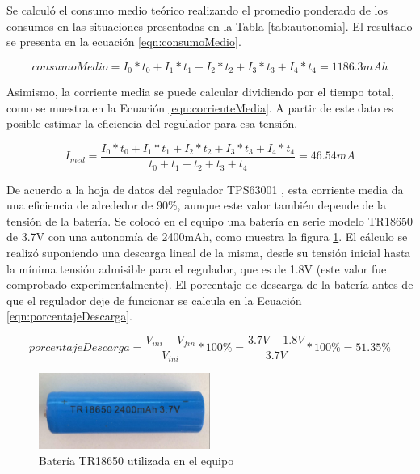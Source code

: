 Se calculó el consumo medio teórico realizando el promedio ponderado de los consumos en las situaciones presentadas en la Tabla \ref{tab:autonomia}. El resultado se presenta en la ecuación \ref{eqn:consumoMedio}.

\begin{equation} \label{eqn:consumoMedio}
consumoMedio = I_{0}*t_{0}+I_{1}*t_{1}+I_{2}*t_{2}+I_{3}*t_{3}+I_{4}*t_{4} = 1186.3 mAh
\end{equation}



Asimismo, la corriente media se puede calcular dividiendo por el tiempo total, como se muestra en la Ecuación \ref{eqn:corrienteMedia}. A partir de este dato es posible estimar la eficiencia del regulador para esa tensión.

\begin{equation} \label{eqn:corrienteMedia}
I_{med} = \frac{I_{0}*t_{0}+I_{1}*t_{1}+I_{2}*t_{2}+I_{3}*t_{3}+I_{4}*t_{4}}{t_{0}+t_{1}+t_{2}+t_{3}+t_{4}}= 46.54mA
\end{equation}

De acuerdo a la hoja de datos del regulador TPS63001 \citep{texas2006}, esta corriente media da una eficiencia de alrededor de 90\%, aunque este valor también depende de la tensión de la batería.
Se colocó en el equipo una batería en serie modelo TR18650 de 3.7V con una autonomía de 2400mAh, como muestra la figura \ref{fig:bateria}. El cálculo se realizó suponiendo una descarga lineal de la misma, desde su tensión inicial hasta la mínima tensión admisible para el regulador, que es de 1.8V\citep{texas2006} (este valor fue comprobado experimentalmente). El porcentaje de descarga de la batería antes de que el regulador deje de funcionar se calcula en la Ecuación \ref{eqn:porcentajeDescarga}.

\begin{equation} \label{eqn:porcentajeDescarga}
porcentajeDescarga = \frac{V_{ini} - V_{fin}}{V_{ini}} * 100\% = \frac{3.7V- 1.8V}{3.7V} * 100\% = 51.35\%
\end{equation}

\begin{figure}[!htbp]
	\centering	
	\includegraphics[width=0.5\textwidth]{./Figures/bateria.jpeg}			
	\caption{Batería TR18650 utilizada en el equipo}
	\label{fig:bateria}
\end{figure}

